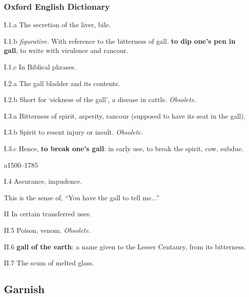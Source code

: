 		\subsubsection{Oxford English Dictionary}
		
			\begin{compactitem}
				\item[I.1.a] The secretion of the liver, bile.
				\item[I.1.b] \textit{figurative.} With reference to the bitterness of gall. \textbf{to dip one's pen in gall}, to write with virulence and rancour.
				\item[I.1.c] In Biblical phrases.
				\item[I.2.a] The gall bladder and its contents.
				\item[I.2.b] Short for `sickness of the gall', a disease in cattle. \textit{Obsolete.}
				\item[I.3.a] Bitterness of spirit, asperity, rancour (supposed to have its seat in the gall).
				\item[I.3.b] Spirit to resent injury or insult. \textit{Obsolete.}
				\item[I.3.c] Hence, \textbf{to break one's gall}: in early use, to break the spirit, cow, subdue.
					\begin{compactitem}
						\item a1500--1785
					\end{compactitem}
				\item[I.4] Assurance, impudence.
					\begin{compactitem}
						\item This is the sense of, ``You have the gall to tell me...''
					\end{compactitem}
				\item[II] In certain transferred uses.
				\item[II.5] Poison, venom. \textit{Obsolete.}
				\item[II.6] \textbf{gall of the earth}: a name given to the Lesser Centaury, from its bitterness.
				\item[II.7] The scum of melted glass.
			\end{compactitem}
			
	\subsection{Garnish} %
		\label{GARNISH}
		
